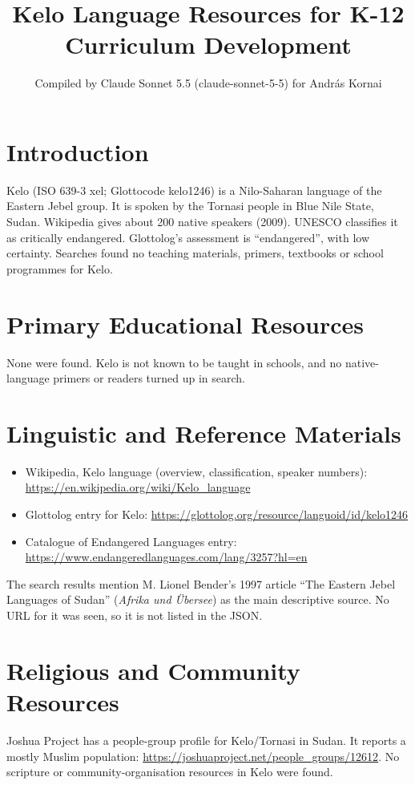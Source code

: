 \documentclass[12pt]{article}
\title{Kelo Language Resources for K-12 Curriculum Development}
\author{Compiled by Claude Sonnet 5.5 (claude-sonnet-5-5) for Andr\'as Kornai}
\date{}
\begin{document}
\maketitle

\section{Introduction}
Kelo (ISO 639-3 xel; Glottocode kelo1246) is a Nilo-Saharan language of the Eastern Jebel group. It is spoken by the Tornasi people in Blue Nile State, Sudan. Wikipedia gives about 200 native speakers (2009). UNESCO classifies it as critically endangered. Glottolog's assessment is ``endangered'', with low certainty. Searches found no teaching materials, primers, textbooks or school programmes for Kelo.

\section{Primary Educational Resources}
None were found. Kelo is not known to be taught in schools, and no native-language primers or readers turned up in search.

\section{Linguistic and Reference Materials}
\begin{itemize}
\item Wikipedia, Kelo language (overview, classification, speaker numbers): \url{https://en.wikipedia.org/wiki/Kelo_language}
\item Glottolog entry for Kelo: \url{https://glottolog.org/resource/languoid/id/kelo1246}
\item Catalogue of Endangered Languages entry: \url{https://www.endangeredlanguages.com/lang/3257?hl=en}
\end{itemize}
The search results mention M. Lionel Bender's 1997 article ``The Eastern Jebel Languages of Sudan'' (\emph{Afrika und \"Ubersee}) as the main descriptive source. No URL for it was seen, so it is not listed in the JSON.

\section{Religious and Community Resources}
Joshua Project has a people-group profile for Kelo/Tornasi in Sudan. It reports a mostly Muslim population: \url{https://joshuaproject.net/people_groups/12612}. No scripture or community-organisation resources in Kelo were found.
\end{document}
